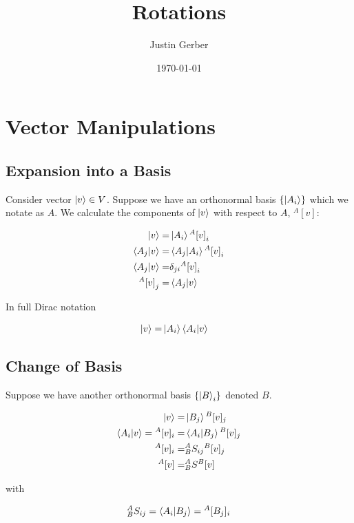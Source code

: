 \documentclass[12pt]{article}
\begin{document}
\title{Rotations}
\author{Justin Gerber}
\date{\today}
\maketitle

\section{Vector Manipulations}

\subsection{Expansion into a Basis}
Consider vector $\ket{v} \in V$.
Suppose we have an orthonormal basis $\{\ket{A_i}\}$ which we notate as $A$.
We calculate the components of $\ket{v}$ with respect to $A$, ${^A[v]}$:

\begin{align}
\ket{v} =& \ket{A_i}{^{A}[v]}_i\\
\braket{A_j|v} =& \braket{A_j|A_i} {^{A}[v]}_i\\
\braket{A_j|v} =& \delta_{ji} {^{A}[v]}_i \\
{^{A}[v]}_j = & \braket{A_j|v}\\
\end{align}

In full Dirac notation

\begin{align}
\ket{v} =& \ket{A_i}\braket{A_i|v}
\end{align}

\subsection{Change of Basis}
Suppose we have another orthonormal basis $\{\ket{B}_i\}$ denoted $B$.

\begin{align}
\ket{v} =& \ket{B_j}  {^{B}[v]_j}\\
\braket{A_i|v} = {^{A}[v]_i} =& \braket{A_i|B_j} {^{B}[v]_j}\\
{^{A}[v]_i} =& {^{A}_{B}S_{ij}} {^{B}[v]_j}\\
{^A[v]} =& {^{A}_{B}S} {^B[v]}\\
\end{align}

with

\begin{align}
{^A_B S_{ij}} = \braket{A_i|B_j} = {^A[B_j]_i}
\end{align}
\end{document}
